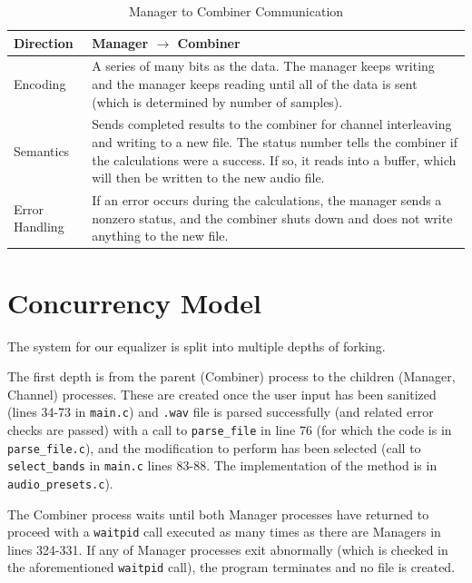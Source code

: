\documentclass[11pt]{extarticle}
\begin{document}
\begin{table}[ht!]
\caption{Manager to Combiner Communication}
\label{t:MC}
\centering
\begin{tabular}{|l|p{14cm}|}
\hline
Direction & Manager $\to$ Combiner \\ \hline
Encoding & A series of many bits as the data. The manager keeps writing and the manager keeps reading until all of the data is sent (which is determined by number of samples). \\ \hline
Semantics & Sends completed results to the combiner for channel interleaving and writing to a new file. The status number tells the combiner if the calculations were a success. If so, it reads into a buffer, which will then be written to the new audio file. \\ \hline
Error Handling & If an error occurs during the calculations, the manager sends a nonzero status, and the combiner shuts down and does not write anything to the new file. \\ \hline
\end{tabular}
\end{table}

\section{Concurrency Model}\label{conc}

The system for our equalizer is split into multiple depths of forking.

The first depth is from the parent (Combiner) process to the children (Manager, Channel) processes. These are created once the user input has been sanitized (lines 34-73 in \texttt{main.c}) and \texttt{.wav} file is parsed successfully (and related error checks are passed) with a call to \texttt{parse\_file} in line 76 (for which the code is in \texttt{parse\_file.c}), and the modification to perform has been selected (call to \texttt{select\_bands} in \texttt{main.c} lines 83-88. The implementation of the method is in \texttt{audio\_presets.c}). 

The Combiner process waits until both Manager processes have returned to proceed with a \texttt{waitpid} call executed as many times as there are Managers in lines 324-331. If any of Manager processes exit abnormally (which is checked in the aforementioned \texttt{waitpid} call), the program terminates and no file is created.
\end{document}
